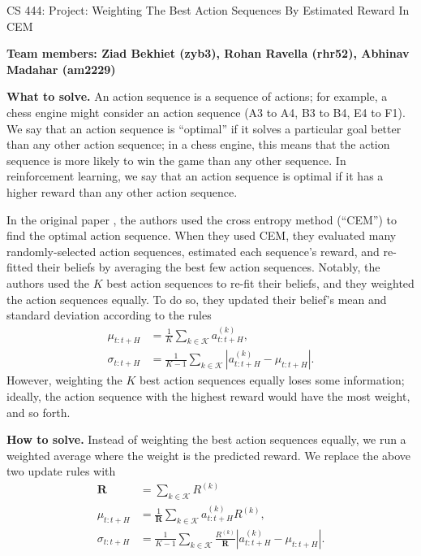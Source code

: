 \documentclass[11pt]{article}
\begin{document}
\begin{center}
    \large{CS 444: Project: Weighting The Best Action Sequences By Estimated Reward In CEM}
\end{center}
\vspace{5mm}

\textbf{Team members: Ziad Bekhiet (zyb3), Rohan Ravella (rhr52), Abhinav Madahar (am2229)}

\noindent\textbf{What to solve.}
An action sequence is a sequence of actions; for example, a chess engine might consider an action sequence (A3 to A4, B3 to B4, E4 to F1).
We say that an action sequence is \enquote{optimal} if it solves a particular goal better than any other action sequence; in a chess engine, this means that the action sequence is more likely to win the game than any other sequence.
In reinforcement learning, we say that an action sequence is optimal if it has a higher reward than any other action sequence.

In the original paper \cite{DBLP:journals/corr/abs-1811-04551}, the authors used the cross entropy method (\enquote{CEM}) to find the optimal action sequence.  %
When they used CEM, they evaluated many randomly-selected action sequences, estimated each sequence's reward, and re-fitted their beliefs by averaging the best few action sequences.
Notably, the authors used the $K$ best action sequences to re-fit their beliefs, and they weighted the action sequences equally.
To do so, they updated their belief's mean and standard deviation according to the rules
\begin{align*}
    \mu_{t:t+H}    &= \frac{1}{K} \sum_{k \in \mathcal{K}} a^{(k)}_{t:t+H}, \\
    \sigma_{t:t+H} &= \frac{1}{K-1} \sum_{k \in \mathcal{K}} \left|a^{(k)}_{t:t+H} - \mu_{t:t+H}\right|.
\end{align*}
However, weighting the $K$ best action sequences equally loses some information; ideally, the action sequence with the highest reward would have the most weight, and so forth.


\textbf{How to solve.}
Instead of weighting the best action sequences equally, we run a weighted average where the weight is the predicted reward.
We replace the above two update rules with
\begin{align*}
    \mathbf{R}     &= \sum_{k \in \mathcal{K}} R^{(k)} \\
    \mu_{t:t+H}    &= \frac{1}{\mathbf{R}} \sum_{k \in \mathcal{K}} a^{(k)}_{t:t+H} R^{(k)}, \\
    \sigma_{t:t+H} &= \frac{1}{K-1} \sum_{k \in \mathcal{K}} \frac{R^{(k)}}{\mathbf{R}} \left|a^{(k)}_{t:t+H} - \mu_{t:t+H}\right|.
\end{align*}
\end{document}
